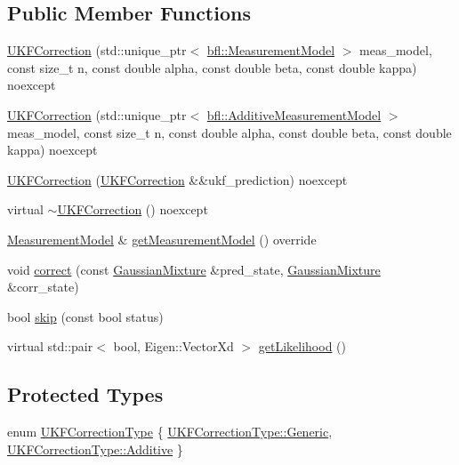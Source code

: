 \subsection*{Public Member Functions}
\begin{DoxyCompactItemize}
\item 
\mbox{\hyperlink{classbfl_1_1UKFCorrection_aeef18124ec4e001215cb618ebda97233}{U\+K\+F\+Correction}} (std\+::unique\+\_\+ptr$<$ \mbox{\hyperlink{classbfl_1_1MeasurementModel}{bfl\+::\+Measurement\+Model}} $>$ meas\+\_\+model, const size\+\_\+t n, const double alpha, const double beta, const double kappa) noexcept
\item 
\mbox{\hyperlink{classbfl_1_1UKFCorrection_a7ec389a4e92efc2c9496be9222575cba}{U\+K\+F\+Correction}} (std\+::unique\+\_\+ptr$<$ \mbox{\hyperlink{classbfl_1_1AdditiveMeasurementModel}{bfl\+::\+Additive\+Measurement\+Model}} $>$ meas\+\_\+model, const size\+\_\+t n, const double alpha, const double beta, const double kappa) noexcept
\item 
\mbox{\hyperlink{classbfl_1_1UKFCorrection_ad0c7121ef3af9bbf9400ee3764cfe01d}{U\+K\+F\+Correction}} (\mbox{\hyperlink{classbfl_1_1UKFCorrection}{U\+K\+F\+Correction}} \&\&ukf\+\_\+prediction) noexcept
\item 
virtual \mbox{\hyperlink{classbfl_1_1UKFCorrection_aa5e3d27cb40f6519984d9fb2bef1662e}{$\sim$\+U\+K\+F\+Correction}} () noexcept
\item 
\mbox{\hyperlink{classbfl_1_1MeasurementModel}{Measurement\+Model}} \& \mbox{\hyperlink{classbfl_1_1UKFCorrection_aa201d96ffc7b94f2ea87927420c8821c}{get\+Measurement\+Model}} () override
\item 
void \mbox{\hyperlink{classbfl_1_1GaussianCorrection_a6308c8af37a1a451eba8e87e73952c84}{correct}} (const \mbox{\hyperlink{classbfl_1_1GaussianMixture}{Gaussian\+Mixture}} \&pred\+\_\+state, \mbox{\hyperlink{classbfl_1_1GaussianMixture}{Gaussian\+Mixture}} \&corr\+\_\+state)
\item 
bool \mbox{\hyperlink{classbfl_1_1GaussianCorrection_a986b05b149650ea4dd725b10700db57f}{skip}} (const bool status)
\item 
virtual std\+::pair$<$ bool, Eigen\+::\+Vector\+Xd $>$ \mbox{\hyperlink{classbfl_1_1GaussianCorrection_a955702adbdad6448d8f306752d3d0868}{get\+Likelihood}} ()
\end{DoxyCompactItemize}
\subsection*{Protected Types}
\begin{DoxyCompactItemize}
\item 
enum \mbox{\hyperlink{classbfl_1_1UKFCorrection_afb5f790b458629da1f1f0e1b7c0a1f0d}{U\+K\+F\+Correction\+Type}} \{ \mbox{\hyperlink{classbfl_1_1UKFCorrection_afb5f790b458629da1f1f0e1b7c0a1f0da8045a0a6c688b0635e3caccc408a1446}{U\+K\+F\+Correction\+Type\+::\+Generic}}, 
\mbox{\hyperlink{classbfl_1_1UKFCorrection_afb5f790b458629da1f1f0e1b7c0a1f0da3f7b3d8ee7bf0d542bd50821c083888f}{U\+K\+F\+Correction\+Type\+::\+Additive}}
 \}
\end{DoxyCompactItemize}
